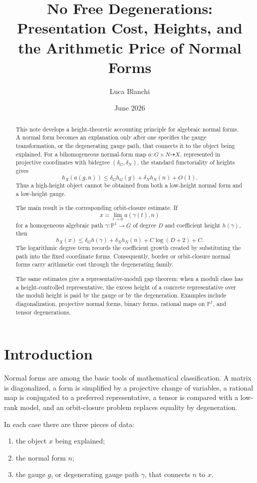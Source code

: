 \documentclass[11pt]{article}
\title{No Free Degenerations: Presentation Cost, Heights, and the Arithmetic Price of Normal Forms}
\author{Luca Blanchi}
\date{June 2026}
\begin{document}
\maketitle

\begin{abstract}
This note develops a height-theoretic accounting principle for algebraic normal forms. A normal form becomes an explanation only after one specifies the gauge transformation, or the degenerating gauge path, that connects it to the object being explained. For a bihomogeneous normal-form map \(a:G\times N\dashrightarrow X\), represented in projective coordinates with bidegree \((\delta_G,\delta_N)\), the standard functoriality of heights gives
\[
h_X(a(g,n))\leq \delta_G h_G(g)+\delta_N h_N(n)+O(1).
\]
Thus a high-height object cannot be obtained from both a low-height normal form and a low-height gauge.

The main result is the corresponding orbit-closure estimate. If
\[
x=\lim_{t\to0}a(\gamma(t),n)
\]
for a homogeneous algebraic path \(\gamma:\mathbb P^1\to \overline G\) of degree \(D\) and coefficient height \(h(\gamma)\), then
\[
h_X(x)\leq \delta_G h(\gamma)+\delta_N h_N(n)+C\log(D+2)+C.
\]
The logarithmic degree term records the coefficient growth created by substituting the path into the fixed coordinate forms. Consequently, border or orbit-closure normal forms carry arithmetic cost through the degenerating family.

The same estimates give a representative-moduli gap theorem: when a moduli class has a height-controlled representative, the excess height of a concrete representative over the moduli height is paid by the gauge or by the degeneration. Examples include diagonalization, projective normal forms, binary forms, rational maps on \(\mathbb P^1\), and tensor degenerations.
\end{abstract}

\section{Introduction}

Normal forms are among the basic tools of mathematical classification. A matrix is diagonalized, a form is simplified by a projective change of variables, a rational map is conjugated to a preferred representative, a tensor is compared with a low-rank model, and an orbit-closure problem replaces equality by degeneration.

In each case there are three pieces of data:
\begin{enumerate}[label=\textup{(\roman*)}]
\item the object \(x\) being explained;
\item the normal form \(n\);
\item the gauge \(g\), or degenerating gauge path \(\gamma\), that connects \(n\) to \(x\).
\end{enumerate}
\end{document}
